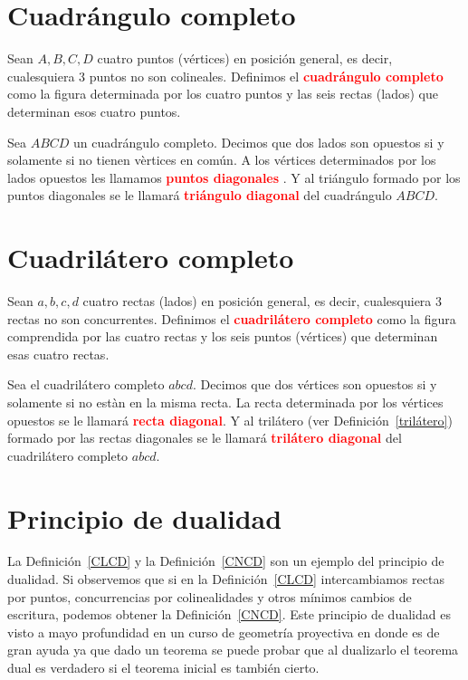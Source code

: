 \section{Cuadrángulo completo}
\begin{df}\label{CNCD}
Sean $A,B,C,D$ cuatro puntos (vértices) en posición general, es decir, cualesquiera 3 puntos no son colineales. Definimos el \textcolor{red}{\bf cuadrángulo completo} como la figura determinada por los cuatro puntos y las seis rectas (lados) que determinan esos cuatro puntos. 
\end{df}
\begin{df}
Sea $ABCD$ un cuadrángulo completo. Decimos que dos lados son opuestos si y solamente si no tienen vèrtices en común. A los vértices determinados por los lados opuestos les llamamos \textcolor{red}{\bf puntos diagonales} . Y al triángulo formado por los puntos diagonales se le llamará \textcolor{red}{\bf triángulo diagonal} del cuadrángulo $ABCD$.
\end{df}

\section{Cuadrilátero completo}
\begin{df}\label{CLCD}
Sean $a,b,c,d$ cuatro rectas (lados) en posición general, es decir, cualesquiera 3 rectas no son concurrentes. Definimos el \textcolor{red}{\bf cuadrilátero completo} como la figura comprendida por las cuatro rectas y los seis puntos (vértices) que determinan esas cuatro rectas. 
\end{df}
\begin{df}
Sea el cuadrilátero completo $abcd$. Decimos que dos vértices son opuestos si y solamente si no estàn en la misma recta. La recta determinada por los vértices opuestos se le llamará \textcolor{red}{\bf recta diagonal}. Y al trilátero (ver Definición~\ref{trilátero}) formado por las rectas diagonales se le llamará \textcolor{red}{\bf trilátero diagonal} del cuadrilátero completo $abcd$.
\end{df}
\section{Principio de dualidad}
La Definición~\ref{CLCD} y la Definición~\ref{CNCD} son un ejemplo del principio de dualidad. Si observemos que si en la Definición~\ref{CLCD} intercambiamos rectas por puntos, concurrencias por colinealidades y otros mínimos cambios de escritura, podemos obtener la Definición~\ref{CNCD}. Este principio de dualidad es visto a mayo profundidad en un curso de geometría proyectiva en donde es de gran ayuda ya que dado un  teorema se puede probar que al dualizarlo el teorema dual es verdadero si el teorema inicial es también cierto. 

